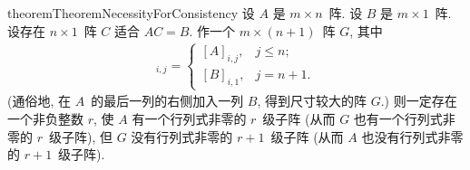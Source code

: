 \begin{restatable}[]{theorem}{TheoremNecessityForConsistency}
    设 \(A\) 是 \(m \times n\)~阵.
    设 \(B\) 是 \(m \times 1\)~阵.
    设存在 \(n \times 1\)~阵 \(C\)
    适合 \(AC = B\).
    作一个 \(m \times (n+1)\)~阵 \(G\),
    其中
    \begin{align*}
        [G]_{i,j}
        = \begin{cases}
              [A]_{i,j}, & j \leq n;  \\
              [B]_{i,1}, & j = n + 1.
          \end{cases}
    \end{align*}
    (通俗地, 在 \(A\)~的最后一列的右侧加入一列 \(B\),
    得到尺寸较大的阵 \(G\).)
    则一定存在一个非负整数 \(r\), 使
    \(A\) 有一个行列式非零的 \(r\)~级子阵
    (从而 \(G\) 也有一个行列式非零的 \(r\)~级子阵),
    但 \(G\) 没有行列式非零的 \(r+1\)~级子阵
    (从而 \(A\) 也没有行列式非零的 \(r+1\)~级子阵).
\end{restatable}

